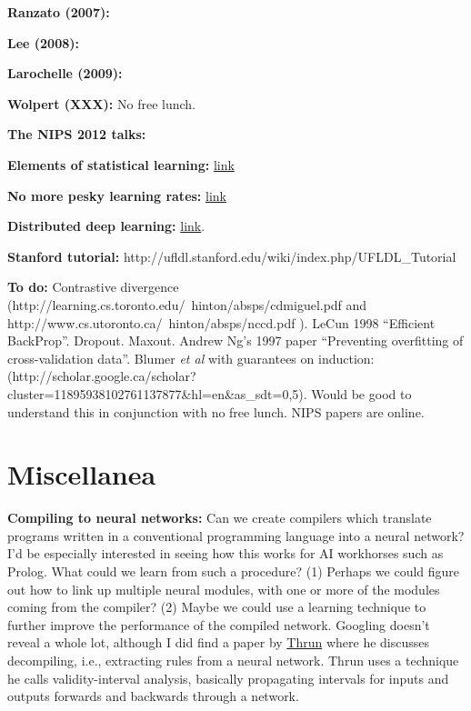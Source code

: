 \documentclass[12pt]{report}
\newcommand{\link}[2]{\href{#1}{#2}}
\begin{document}
\textbf{Ranzato (2007):}

\textbf{Lee (2008):} 

\textbf{Larochelle (2009):}

\textbf{Wolpert (XXX):} No free lunch.

\textbf{The NIPS 2012 talks:}

\textbf{Elements of statistical learning:} \link{http://www.stanford.edu/\~hastie/local.ftp/Springer/OLD//ESLII\_print4.pdf}{link}

\textbf{No more pesky learning rates:} \link{http://arxiv.org/pdf/1206.1106.pdf}{link}

\textbf{Distributed deep learning:}
\link{http://research.google.com/archive/large\_deep\_networks_nips2012.html}{link}.

\textbf{Stanford tutorial:} http://ufldl.stanford.edu/wiki/index.php/UFLDL\_Tutorial

\textbf{To do:} Contrastive divergence
(http://learning.cs.toronto.edu/~hinton/absps/cdmiguel.pdf and
http://www.cs.utoronto.ca/~hinton/absps/nccd.pdf ). LeCun 1998
``Efficient BackProp''.  Dropout.  Maxout.  Andrew Ng's 1997 paper
``Preventing overfitting of cross-validation data''.  Blumer \emph{et
  al} with guarantees on induction:
(http://scholar.google.ca/scholar?cluster=11895938102761137877\&hl=en\&as\_sdt=0,5).
Would be good to understand this in conjunction with no free lunch.
NIPS papers are online.  


\chapter{Miscellanea}

\textbf{Compiling to neural networks:} Can we create compilers which
translate programs written in a conventional programming language into
a neural network?  I'd be especially interested in seeing how this
works for AI workhorses such as Prolog.  What could we learn from such
a procedure?  (1) Perhaps we could figure out how to link up multiple
neural modules, with one or more of the modules coming from the
compiler? (2) Maybe we could use a learning technique to further
improve the performance of the compiled network.  Googling doesn't
reveal a whole lot, although I did find a paper by
\link{http://scholar.google.ca/scholar?cluster=10518384657895134615\&hl=en\&as\_sdt=0,5}{Thrun}
where he discusses decompiling, i.e., extracting rules from a neural
network.  Thrun uses a technique he calls validity-interval analysis,
basically propagating intervals for inputs and outputs forwards and
backwards through a network.
\end{document}
